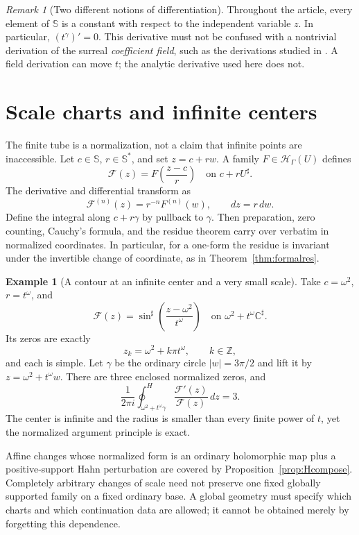 \documentclass[11pt,a4paper]{article}
\theoremstyle{definition}
\newtheorem{example}[theorem]{Example}
\theoremstyle{remark}
\newtheorem{remark}[theorem]{Remark}
\newcommand{\SC}{\mathbb S}
\newcommand{\C}{\mathbb C}
\newcommand{\Z}{\mathbb Z}
\newcommand{\HH}{\mathcal H}
\newcommand{\Hoint}{\mathop{\oint}\nolimits^{\!H}}
\begin{document}
\begin{remark}[Two different notions of differentiation]
Throughout the article, every element of $\SC$ is a constant with
respect to the independent variable $z$. In particular,
$(t^\gamma)'=0$. This derivative must not be confused with a
nontrivial derivation of the surreal \emph{coefficient field}, such as
the derivations studied in \cite{BMderiv}. A field derivation can move
$t$; the analytic derivative used here does not.
\end{remark}

\section{Scale charts and infinite centers}\label{sec:scales}
The finite tube is a normalization, not a claim that infinite points
are inaccessible. Let $c\in\SC$, $r\in\SC^*$, and set
$z=c+rw$. A family $F\in\HH_\Gamma(U)$ defines
\[
 \mathcal F(z)=F\!\left(\frac{z-c}{r}\right)
       \quad\text{on }c+rU^\sharp.
\]
The derivative and differential transform as
\[
 \mathcal F^{(n)}(z)=r^{-n}F^{(n)}(w),\qquad dz=r\,dw.
\]
Define the integral along $c+r\gamma$ by pullback to $\gamma$.
Then preparation, zero counting, Cauchy's formula, and the residue
theorem carry over verbatim in normalized coordinates. In particular,
for a one-form the residue is invariant under the invertible change
of coordinate, as in Theorem~\ref{thm:formalres}.

\begin{example}[A contour at an infinite center and a very small scale]
Take $c=\omega^2$, $r=t^\omega$, and
\[
 \mathcal F(z)=\sin^\sharp\!\left(\frac{z-\omega^2}{t^\omega}\right)
 \quad\text{on }\omega^2+t^\omega\C^\sharp.
\]
Its zeros are exactly
\[
 z_k=\omega^2+k\pi t^\omega,\qquad k\in\Z,
\]
and each is simple. Let $\gamma$ be the ordinary circle
$|w|=3\pi/2$ and lift it by $z=\omega^2+t^\omega w$. There are
three enclosed normalized zeros, and
\[
 \frac1{2\pi i}\Hoint_{\omega^2+t^\omega\gamma}
        \frac{\mathcal F'(z)}{\mathcal F(z)}\,dz=3.
\]
The center is infinite and the radius is smaller than every finite
power of $t$, yet the normalized argument principle is exact.
\end{example}

Affine changes whose normalized form is an ordinary holomorphic map
plus a positive-support Hahn perturbation are covered by
Proposition~\ref{prop:Hcompose}. Completely arbitrary changes of scale
need not preserve one fixed globally supported family on a fixed
ordinary base. A global geometry must specify which charts and which
continuation data are allowed; it cannot be obtained merely by
forgetting this dependence.
\end{document}
